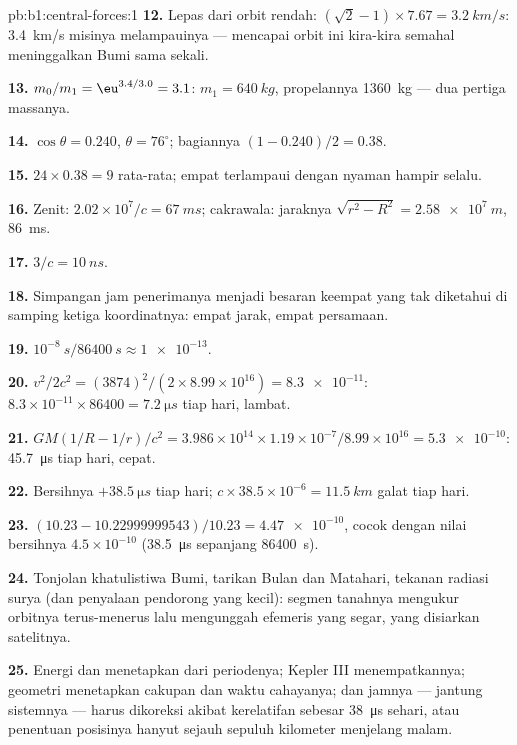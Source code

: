 \begin{solution}{pb:b1:central-forces:1}
\textbf{12.} Lepas dari orbit rendah: $(\sqrt2 - 1)\times 7.67 = \qty{3.2}{km/s}$:
\qty{3.4}{km/s} misinya melampauinya --- mencapai orbit ini kira-kira
semahal meninggalkan Bumi sama sekali.

\textbf{13.} $m_0/m_1 = \eu^{3.4/3.0} = 3.1$: $m_1 = \qty{640}{kg}$,
propelannya \qty{1360}{kg} --- dua pertiga massanya.

\textbf{14.} $\cos\theta = 0.240$, $\theta = 76^\circ$; bagiannya $(1 - 0.240)/2
= 0.38$.

\textbf{15.} $24 \times 0.38 = 9$ rata-rata; empat terlampaui dengan
nyaman hampir selalu.

\textbf{16.} Zenit: $2.02\times10^7/c = \qty{67}{ms}$; cakrawala: jaraknya
$\sqrt{r^2 - R^2} = \qty{2.58e7}{m}$, \qty{86}{ms}.

\textbf{17.} $3/c = \qty{10}{ns}$.

\textbf{18.} Simpangan jam penerimanya menjadi besaran keempat yang tak
diketahui di samping ketiga koordinatnya: empat jarak, empat persamaan.

\textbf{19.} $10^{-8}\ \unit{s}/\qty{86400}{s} \approx \num{1e-13}$.

\textbf{20.} $v^2/2c^2 = (3874)^2/(2 \times 8.99\times10^{16}) = \num{8.3e-11}$:
$8.3\times10^{-11} \times 86400 = \qty{7.2}{\micro s}$ tiap hari, lambat.

\textbf{21.} $GM(1/R - 1/r)/c^2 = 3.986\times10^{14} \times 1.19\times10^{-7}/
8.99\times10^{16} = \num{5.3e-10}$: \qty{45.7}{\micro s} tiap hari, cepat.

\textbf{22.} Bersihnya $+\qty{38.5}{\micro s}$ tiap hari; $c \times 38.5\times10^{-6}
= \qty{11.5}{km}$ galat tiap hari.

\textbf{23.} $(10.23 - 10.22999999543)/10.23 = \num{4.47e-10}$, cocok
dengan nilai bersihnya $4.5\times10^{-10}$ (\qty{38.5}{\micro s} sepanjang \qty{86400}{s}).

\textbf{24.} Tonjolan khatulistiwa Bumi, tarikan Bulan dan Matahari,
tekanan radiasi surya (dan penyalaan pendorong yang kecil): segmen
tanahnya mengukur orbitnya terus-menerus lalu mengunggah efemeris yang
segar, yang disiarkan satelitnya.

\textbf{25.} Energi dan  menetapkan  dari
periodenya; Kepler III menempatkannya; geometri menetapkan cakupan dan
waktu cahayanya; dan jamnya --- jantung sistemnya --- harus dikoreksi
akibat kerelatifan sebesar \qty{38}{\micro s} sehari, atau penentuan
posisinya hanyut sejauh sepuluh kilometer menjelang malam.
\end{solution}
